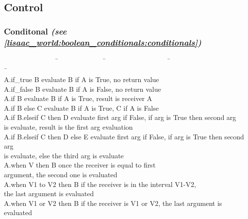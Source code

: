 \documentclass[11pt]{mybook}
\begin{document}
\subsection{Control}
\label{lisaac_world:glossary:control}
\subsubsection{Conditonal {\it{}(see \ref{lisaac_world:boolean_conditionals:conditionals})} }
\label{lisaac_world:glossary:control:control:conditional}
\begin{tabbing}
~~~~~~~~~~~~~~~~\=~~~~~~~~~~~~~~\=~~~~~~~~~~~~~~~~~~~\=~~~~~~~~~~~~~~~~~~~~~~~~\=\kill\\
{A.if\_true B}                  \> \>        \> {evaluate B if A is True, no return value}\\
{A.if\_false B}                 \> \>        \> {evaluate B if A is False, no return value}\\
{A.if B}                        \> \>        \> {evaluate B if A is True, result is receiver A}\\
{A.if B else C}                 \> \>        \> {evaluate B if A is True, C if A is False}\\
{A.if B.elseif C then D}        \> \>        \> {evaluate first arg if False, if arg is True then second arg}\\
                                \> \>        \> {is evaluate, result is the first arg evaluation}\\
{A.if B.elseif C then D else E} \> \>        \> {evaluate first arg if False, if arg is True then second arg}\\
                                \> \>        \> {is evaluate, else the third arg is evaluate}\\
{A.when V then B}               \> \>        \> {once the receiver is equal to first}\\
                                \> \>        \> {argument, the second one is evaluated} \\
{A.when V1 to V2 then B}        \> \>        \> {if the receiver is in the interval V1-V2,}\\
                                \> \>        \> {the last argument is evaluated} \\
{A.when V1 or V2 then B}        \> \>        \> {if the receiver is V1 or V2, the
                              last argument is evaluated} \\\end{tabbing}             
\end{document}
